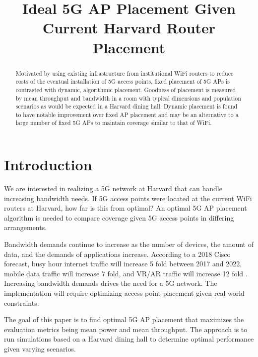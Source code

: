 \documentclass[conference]{IEEEtran}
\begin{document}
\title{Ideal 5G AP Placement Given Current Harvard Router Placement}

\author{
\and
{}
}

\maketitle

\begin{abstract}
Motivated by using existing infrastructure from institutional WiFi routers to
reduce costs of the eventual installation of 5G access points, fixed placement
of 5G APs is contrasted with dynamic, algorithmic placement. Goodness of
placement is measured by mean throughput and bandwidth in a room with typical
dimensions and population scenarios as would be expected in a Harvard dining
hall. Dynamic placement is found to have notable improvement over fixed AP
placement and may be an alternative to a large number of fixed 5G APs to
maintain coverage similar to that of WiFi.
\end{abstract}


\section{Introduction}
We are interested in realizing a 5G network at Harvard that can handle increasing bandwidth needs. If 5G access points were located at the current WiFi routers at Harvard, how far is this from optimal? An optimal 5G AP placement algorithm is needed to compare coverage given 5G access points in differing arrangements. 
    
Bandwidth demands continue to increase as the number of devices, the amount of data, and the demands of applications increase. According to a 2018 Cisco forecast, busy hour internet traffic will increase 5 fold between 2017 and 2022, mobile data traffic will increase 7 fold, and VR/AR traffic will increase 12 fold \cite{b1}. Increasing bandwidth demands drives the need for a 5G network. The implementation will require optimizing access point placement given real-world constraints.
    
The goal of this paper is to find optimal 5G AP placement that maximizes the evaluation metrics being  mean power and mean throughput. The approach is to run simulations based on a Harvard dining hall to determine optimal performance given varying scenarios. 
\end{document}
